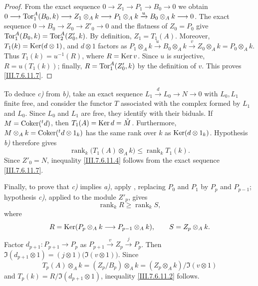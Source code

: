 {\begin{remarks}[7.6.11]
\begin{proof}
From the exact sequence $0\longrightarrow Z_1\longrightarrow P_1
\longrightarrow B_0\longrightarrow0$
we obtain $0\longrightarrow\operatorname{Tor}_1^A(B_0,k)
\longrightarrow Z_1\otimes_A k
\longrightarrow P_1\otimes_A k
\xrightarrow{u}B_0\otimes_A k
\longrightarrow0$.
The exact sequence $0\longrightarrow B_0\longrightarrow Z_0
\longrightarrow Z'_0\longrightarrow0$
and the flatness of $Z_0=P_0$ give $\operatorname{Tor}_1^A(B_0,k)=\operatorname{Tor}_2^A(Z'_0,k)$.
By definition, $Z_1=T_1(A)$.  Moreover,
$T_1(k)=\operatorname{Ker}(d\otimes1)$, and $d\otimes1$ factors as $P_1\otimes_A k
\xrightarrow{u}B_0\otimes_A k
\xrightarrow{v}Z_0\otimes_A k
=
P_0\otimes_A k$.
Thus $T_1(k)=u^{-1}(R)$, where $R=\operatorname{Ker} v$.  Since $u$ is
surjective, $R=u(T_1(k))$; finally,
$R=\operatorname{Tor}_1^A(Z'_0,k)$ by the definition of $v$.  This proves
\eqref{III.7.6.11.7}.
\end{proof}

To deduce \emph{c)} from \emph{b)}, take an exact
sequence $L_1\xrightarrow{d}L_0\longrightarrow N\longrightarrow0$
with $L_0,L_1$ finite free, and consider the functor $T$
associated with the complex formed by $L_1$ and $L_0$.
Since $L_0$ and $L_1$ are free, they identify with their
biduals.  If $M=\operatorname{Coker}({}^t d)$,
then $T_1(A)=\operatorname{Ker} d=\check M$.
Furthermore, $M\otimes_A k=\operatorname{Coker}({}^t d\otimes1_k)$
has the same rank over $k$ as $\operatorname{Ker}(d\otimes1_k)$.
Hypothesis \emph{b)} therefore gives
\[
  \operatorname{rank}_k\bigl(T_1(A)\otimes_A k\bigr)
  \leq
  \operatorname{rank}_kT_1(k).
\]
Since $Z'_0=N$, inequality \eqref{III.7.6.11.4} follows from
the exact sequence \eqref{III.7.6.11.7}.

Finally, to prove that \emph{c)} implies
\emph{a)}, apply , replacing $P_0$
and $P_1$ by $P_p$ and $P_{p-1}$; hypothesis \emph{c)},
applied to the module $Z'_p$, gives
\[
  \operatorname{rank}_k R\geq\operatorname{rank}_k S,
\]
where
\[
  R=\operatorname{Ker}(P_p\otimes_A k\longrightarrow P_{p-1}\otimes_A k),
  \qquad
  S=Z_p\otimes_A k.
\]
Factor $d_{p+1}:P_{p+1}\to P_p$ as $P_{p+1}\xrightarrow{v}Z_p\xrightarrow{j}P_p$.
Then $\Im(d_{p+1}\otimes1)
=
(j\otimes1)\bigl(\Im(v\otimes1)\bigr)$.
Since
\[
  T_p(A)\otimes_A k
  =
  (Z_p/B_p)\otimes_A k
  =
  (Z_p\otimes_A k)/\Im(v\otimes1)
\]
and $T_p(k)=R/\Im(d_{p+1}\otimes1)$,
inequality \eqref{III.7.6.11.2} follows.


\end{remarks}}
